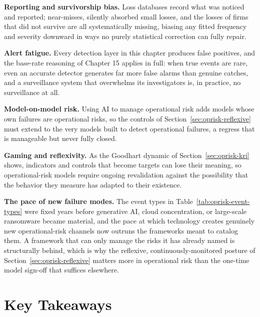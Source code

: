 \documentclass[../ai_in_finance]{subfiles}
\begin{document}
\textbf{Reporting and survivorship bias.} Loss databases record what was noticed and reported; near-misses, silently absorbed small losses, and the losses of firms that did not survive are all systematically missing, biasing any fitted frequency and severity downward in ways no purely statistical correction can fully repair.

\textbf{Alert fatigue.} Every detection layer in this chapter produces false positives, and the base-rate reasoning of Chapter 15 applies in full: when true events are rare, even an accurate detector generates far more false alarms than genuine catches, and a surveillance system that overwhelms its investigators is, in practice, no surveillance at all.

\textbf{Model-on-model risk.} Using AI to manage operational risk adds models whose own failures are operational risks, so the controls of Section~\ref{sec:oprisk-reflexive} must extend to the very models built to detect operational failures, a regress that is manageable but never fully closed.

\textbf{Gaming and reflexivity.} As the Goodhart dynamic of Section~\ref{sec:oprisk-kri} shows, indicators and controls that become targets can lose their meaning, so operational-risk models require ongoing revalidation against the possibility that the behavior they measure has adapted to their existence.

\textbf{The pace of new failure modes.} The event types in Table~\ref{tab:oprisk-event-types} were fixed years before generative AI, cloud concentration, or large-scale ransomware became material, and the pace at which technology creates genuinely new operational-risk channels now outruns the frameworks meant to catalog them. A framework that can only manage the risks it has already named is structurally behind, which is why the reflexive, continuously-monitored posture of Section~\ref{sec:oprisk-reflexive} matters more in operational risk than the one-time model sign-off that suffices elsewhere.

\section{Key Takeaways}
\end{document}
